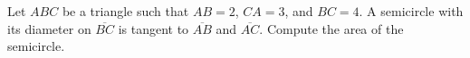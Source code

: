 Let $ABC$ be a triangle such that $AB=2$, $CA=3$, and $BC=4$. A semicircle with its diameter on $\overline{BC}$ is tangent to $\overline{AB}$ and $\overline{AC}$. Compute the area of the semicircle.